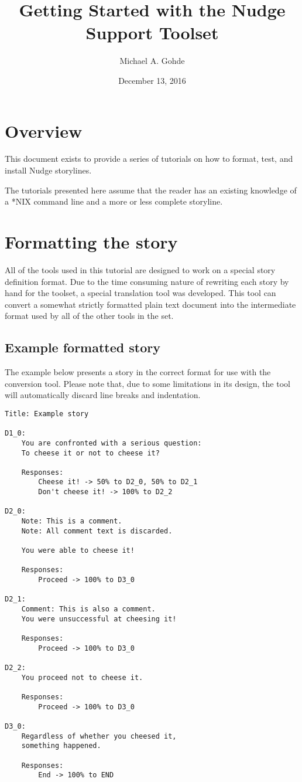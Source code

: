 \documentclass[12pt,letterpaper]{article}
\begin{document}
\title{Getting Started with the Nudge Support Toolset}
\author{Michael A. Gohde}
\date{December 13, 2016}
\maketitle

\section{Overview}
This document exists to provide a series of tutorials on how to format, test, and install Nudge storylines.

The tutorials presented here assume that the reader has an existing knowledge of a *NIX command line and 
a more or less complete storyline.

\section{Formatting the story}
All of the tools used in this tutorial are designed to work on a special story definition format. Due to
the time consuming nature of rewriting each story by hand for the toolset, a special translation tool
was developed. This tool can convert a somewhat strictly formatted plain text document into the intermediate
format used by all of the other tools in the set. 

\subsection{Example formatted story}
The example below presents a story in the correct format for use with the conversion tool.
Please note that, due to some limitations in its design, the tool will automatically discard line breaks and
indentation. 

\begin{lstlisting}[breaklines=true]
Title: Example story

D1_0:
    You are confronted with a serious question: 
    To cheese it or not to cheese it?
    
    Responses:
        Cheese it! -> 50% to D2_0, 50% to D2_1
        Don't cheese it! -> 100% to D2_2

D2_0:
    Note: This is a comment.
    Note: All comment text is discarded.
    
    You were able to cheese it!
    
    Responses:
        Proceed -> 100% to D3_0

D2_1:
    Comment: This is also a comment.
    You were unsuccessful at cheesing it!
    
    Responses:
        Proceed -> 100% to D3_0

D2_2:
    You proceed not to cheese it.
    
    Responses:
        Proceed -> 100% to D3_0
        
D3_0:
    Regardless of whether you cheesed it, 
    something happened.
    
    Responses:
        End -> 100% to END
\end{lstlisting}
\end{document}
